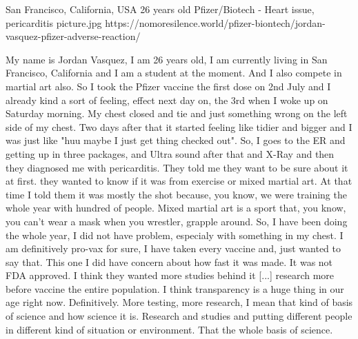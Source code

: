 {San Francisco, California, USA}
{26 years old}
{Pfizer/Biotech}
{-}
{Heart issue, pericarditis}
{picture.jpg}
{https://nomoresilence.world/pfizer-biontech/jordan-vasquez-pfizer-adverse-reaction/}
{

My name is Jordan Vasquez, I am 26 years old, I am currently living in San
Francisco, California and I am a student at the moment. And I also compete in
martial art also. So I took the Pfizer vaccine the first dose on 2nd July and I
already kind a sort of feeling, effect next day on, the 3rd when I woke up on
Saturday morning. My chest closed and tie and just something wrong on the left
side of my chest. Two days after that it started feeling like tidier and bigger
and I was just like "huu maybe I just get thing checked out". So, I goes to the
ER and getting up in three packages, and Ultra sound after that and X-Ray and
then they diagnosed me with pericarditis. They told me they want to be sure
about it at first. they wanted to know if it was from exercise or mixed martial
art. At that time I told them it was mostly the shot because, you know, we were
training the whole year with hundred of people. Mixed martial art is a sport
that, you know, you can't wear a mask when you wrestler, grapple around. So, I
have been doing the whole year, I did not have problem, especialy with something
in my chest. I am definitively pro-vax for sure, I have taken every vaccine and,
just wanted to say that. This one I did have concern about how fast it was
made. It was not FDA approved. I think they wanted more studies behind it [...]
research more before vaccine the entire population. I think transparency is a
huge thing in our age right now. Definitively. More testing, more research, I
mean that kind of basis of science and how science it is. Research and studies
and putting different people in different kind of situation or environment. That
the whole basis of science.

}

